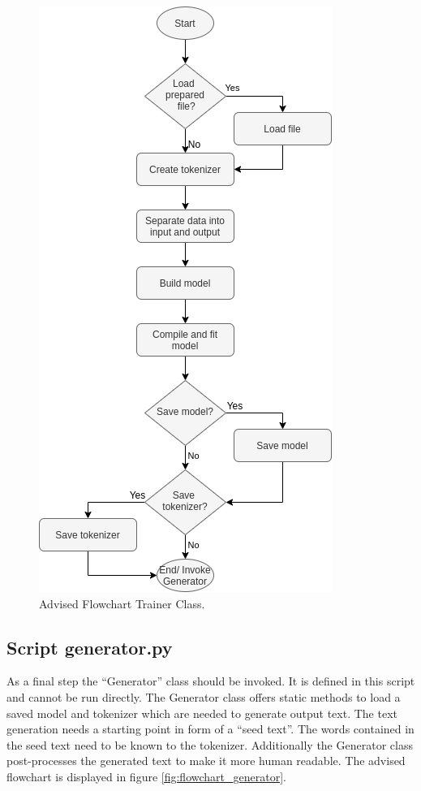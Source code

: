\documentclass[conference]{IEEEtran}
\begin{document}
\begin{figure}[htbp]
\centerline{\includegraphics[scale=0.65]{pictures/flowchart_trainer.png}}
\caption{Advised Flowchart Trainer Class.}
\label{fig:flowchart_trainer}
\end{figure}

\subsection{Script generator.py}\label{subsec_generator}

As a final step the ``Generator'' class should be invoked. It is defined in this script and cannot be run directly. The Generator class offers static methods to load a saved model and tokenizer which are needed to generate output text. The text generation needs a starting point in form of a ``seed text''. The words contained in the seed text need to be known to the tokenizer. Additionally the Generator class post-processes the generated text to make it more human readable. The advised flowchart is displayed in figure \ref{fig:flowchart_generator}.
\end{document}

